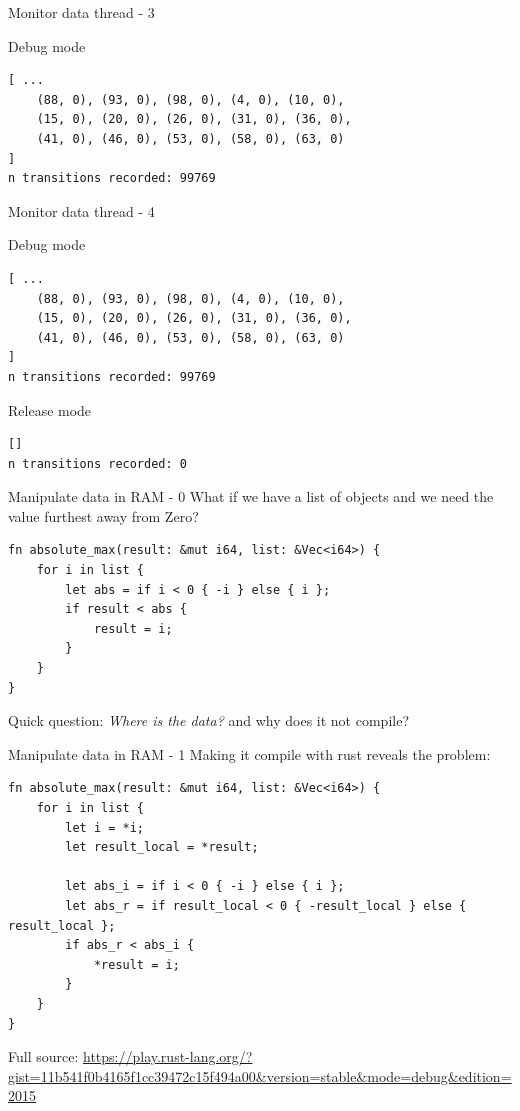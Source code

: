\documentclass[10pt]{beamer}
\begin{document}
\begin{frame}[fragile]{Monitor data thread - 3}

      \begin{block}{Debug mode}
\begin{verbatim}
[ ...
    (88, 0), (93, 0), (98, 0), (4, 0), (10, 0),
    (15, 0), (20, 0), (26, 0), (31, 0), (36, 0),
    (41, 0), (46, 0), (53, 0), (58, 0), (63, 0)
]
n transitions recorded: 99769
\end{verbatim}
      \end{block}
\end{frame}
\begin{frame}[fragile]{Monitor data thread - 4}

      \begin{block}{Debug mode}
\begin{verbatim}
[ ...
    (88, 0), (93, 0), (98, 0), (4, 0), (10, 0),
    (15, 0), (20, 0), (26, 0), (31, 0), (36, 0),
    (41, 0), (46, 0), (53, 0), (58, 0), (63, 0)
]
n transitions recorded: 99769
\end{verbatim}
      \end{block}

    \begin{block}{Release mode}
\begin{verbatim}
[]
n transitions recorded: 0
\end{verbatim}
      \end{block}
\end{frame}

\begin{frame}[fragile]{Manipulate data in RAM - 0}
What if we have a list of objects and we need the value furthest away from Zero?
\begin{verbatim}
fn absolute_max(result: &mut i64, list: &Vec<i64>) {
    for i in list {
        let abs = if i < 0 { -i } else { i };
        if result < abs {
            result = i;
        }
    }
}
\end{verbatim}
Quick question: \emph{Where is the data?} and why does it \alert{not} compile?
\end{frame}

\begin{frame}[fragile]{Manipulate data in RAM - 1}
Making it compile with rust reveals the problem:
\begin{verbatim}
fn absolute_max(result: &mut i64, list: &Vec<i64>) {
    for i in list {
        let i = *i;
        let result_local = *result;
        
        let abs_i = if i < 0 { -i } else { i };
        let abs_r = if result_local < 0 { -result_local } else { result_local };
        if abs_r < abs_i {
            *result = i;
        }
    }
}
\end{verbatim}
Full source: \url{https://play.rust-lang.org/?gist=11b541f0b4165f1cc39472c15f494a00&version=stable&mode=debug&edition=2015}
\end{frame}
\end{document}
